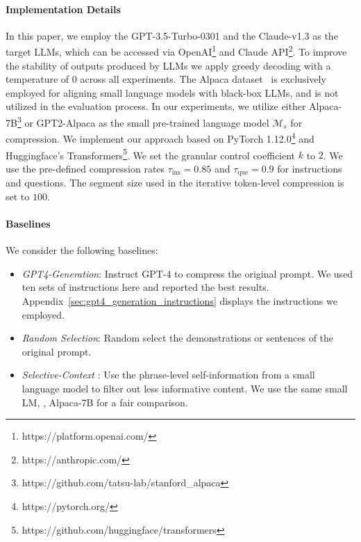 \paragraph{Implementation Details}
In this paper, we employ the GPT-3.5-Turbo-0301 and the Claude-v1.3 %
as the target LLMs, which can be accessed via OpenAI\footnote{https://platform.openai.com/} and Claude API\footnote{https://anthropic.com/}.
To improve the stability of outputs produced by LLMs
we apply greedy decoding with a temperature of $0$ across all experiments.
The Alpaca dataset~\cite{alpaca} is exclusively employed for aligning small language models with black-box LLMs, and is not utilized in the evaluation process. 
In our experiments, we utilize either Alpaca-7B\footnote{https://github.com/tatsu-lab/stanford\_alpaca} or GPT2-Alpaca as the small pre-trained language model $\mathcal{M}_s$ for compression.
We implement our approach based on PyTorch 1.12.0\footnote{https://pytorch.org/} and Huggingface's Transformers\footnote{https://github.com/huggingface/transformers}.
We set the granular control coefficient $k$ to $2$.
We use the pre-defined compression rates $\tau_{\text{ins}}=0.85$ and $\tau_{\text{que}}=0.9$ for instructions and questions.
The segment size used in the iterative token-level compression is set to $100$.




\paragraph{Baselines}
We consider the following baselines:
\begin{itemize}
\setlength{\itemsep}{0pt}
\item \textit{GPT4-Generation}: Instruct GPT-4 to compress the original prompt.
We used ten sets of instructions here and reported the best results.
Appendix~\ref{sec:gpt4_generation_instructions} displays the instructions we employed.
\item \textit{Random Selection}: Random select the demonstrations or sentences of the original prompt.
\item \textit{Selective-Context} \cite{li2023unlocking}: Use the phrase-level self-information from a small language model to filter out less informative content. We use the same small LM, \ie, Alpaca-7B for a fair comparison.
\end{itemize}

